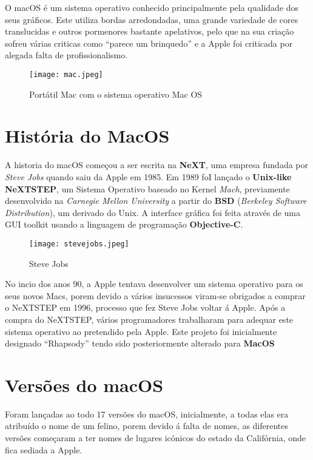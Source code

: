 \documentclass{report}
\begin{document}
O macOS é um sistema operativo conhecido principalmente pela qualidade dos seus gráficos. Este utiliza bordas arredondadas, uma grande variedade de cores translucidas e outros pormenores bastante apelativos, pelo que na sua criação sofreu várias criticas como “parece um brinquedo” e a Apple foi criticada por alegada falta de profissionalismo.

\begin{figure}[h!]
    \centering
    \texttt{[image: mac.jpeg]}
    \caption{Portátil Mac com o sistema operativo Mac OS}
\end{figure}


\section{História do MacOS}

A historia do macOS começou a ser escrita na \textbf{NeXT}, uma empresa fundada por \textit{Steve Jobs} quando saiu da Apple em 1985. Em 1989 foI lançado o \textbf{Unix-like NeXTSTEP}, um Sistema Operativo baseado no Kernel \textit{Mach}, previamente desenvolvido na \textit{Carnegie Mellon University} a partir do \textbf{BSD} (\textit{Berkeley Software Distribution}), um derivado do Unix.  A interface gráfica foi feita através de uma GUI toolkit usando a linguagem de programação \textbf{Objective-C}.

\begin{figure}[h!]
    \centering
    \texttt{[image: stevejobs.jpeg]}
    \caption{Steve Jobs}
\end{figure}

No incio dos anos 90, a Apple tentava desenvolver um sistema operativo para os seus novos Macs, porem devido a vários insucessos viram-se obrigados a comprar o NeXTSTEP em 1996, processo que fez Steve Jobs voltar á Apple. Após a compra do NeXTSTEP, vários programadores trabalharam para adequar este sistema operativo ao pretendido pela Apple. Este projeto foi inicialmente designado “Rhapsody” tendo sido posteriormente alterado para \textbf{MacOS}

\section{Versões do macOS}

Foram lançadas ao todo 17 versões do macOS, inicialmente, a todas elas era atribuído o nome de um felino, porem devido á falta de nomes, as diferentes versões começaram a ter nomes de lugares icónicos do estado da Califórnia, onde fica sediada a Apple.
\end{document}
